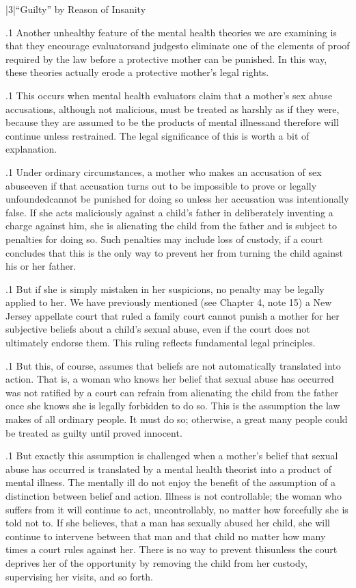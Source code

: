 \documentclass[11pt, twoside]{article}
\begin{document}
{\s|3|{``Guilty'' by Reason of Insanity}

\p.1{%
\noindent{}Another unhealthy feature of the mental health theories we are examining is that they encourage evaluators\mdash{}and judges\mdash{}to eliminate one
of the elements of proof required by the law before a protective mother
can be punished. In this way, these theories actually erode a protective
mother’s legal rights.
}%

\p.1{%
This occurs when mental health evaluators claim that a mother’s sex
abuse accusations, although not malicious, must be treated as harshly
as if they were, because they are assumed to be the products of mental illness\mdash{}and therefore will continue unless restrained. The legal
significance of this is worth a bit of explanation.
}%

\p.1{%
Under ordinary circumstances, a mother who makes an accusation of
sex abuse\mdash{}even if that accusation turns out to be impossible to prove
or legally unfounded\mdash{}cannot be punished for doing so unless her accusation was intentionally false. If she acts maliciously against a child’s
father in deliberately inventing a charge against him, she is alienating
the child from the father and is subject to penalties for doing so. Such
penalties may include loss of custody, if a court concludes that this is
the only way to prevent her from turning the child against his or her
father.
}%

\p.1{%
But if she is simply mistaken in her suspicions, no penalty may be
legally applied to her. We have previously mentioned (see Chapter 4,
note 15) a New Jersey appellate court that ruled a family court cannot
punish a mother for her subjective beliefs about a child’s sexual abuse,
even if the court does not ultimately endorse them. This ruling reflects
fundamental legal principles.
}%

\p.1{%
But this, of course, assumes that beliefs are not automatically translated into action. That is, a woman who knows her belief that sexual
abuse has occurred was not ratified by a court can refrain from alienating
the child from the father once she knows she is legally forbidden to do
so. This is the assumption the law makes of all ordinary people. It must
do so; otherwise, a great many people could be treated as guilty until
proved innocent.
}%

\p.1{%
But exactly this assumption is challenged when a mother’s belief that
sexual abuse has occurred is translated by a mental health theorist into
a product of mental illness. The mentally ill do not enjoy the benefit of
the assumption of a distinction between belief and action. Illness is not
controllable; the woman who suffers from it will continue to act, uncontrollably, no matter how forcefully she is told not to. If she believes,
 that a man has sexually abused her child, she will continue to intervene between that man and that child no matter how many
times a court rules against her. There is no way to prevent this\mdash{}unless
the court deprives her of the opportunity by removing the child from
her custody, supervising her visits, and so forth.
}%

}
\end{document}
